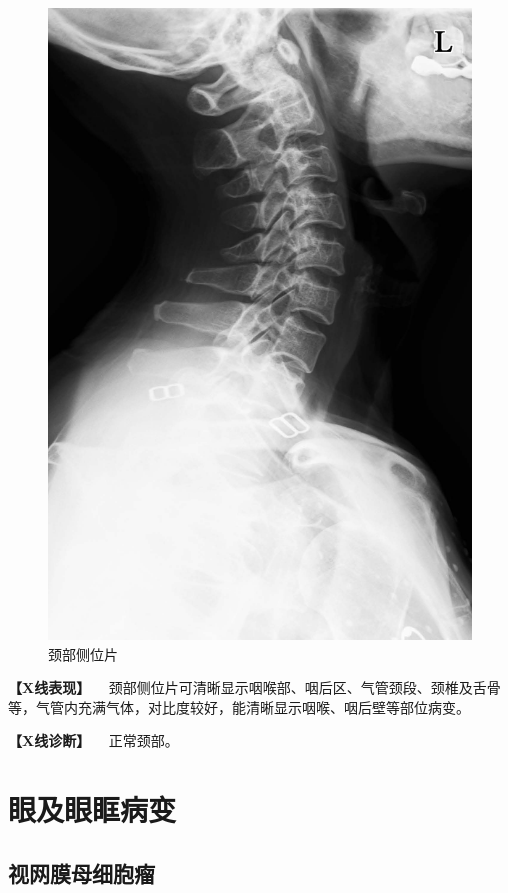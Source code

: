 \begin{figure}[!htbp]
 \centering
 \includegraphics{./images/Image00416.jpg}
 \captionsetup{justification=centering}
 \caption{颈部侧位片}
 \label{fig7-1-6}
  \end{figure} 

\textbf{【X线表现】}
　颈部侧位片可清晰显示咽喉部、咽后区、气管颈段、颈椎及舌骨等，气管内充满气体，对比度较好，能清晰显示咽喉、咽后壁等部位病变。

\textbf{【X线诊断】} 　正常颈部。

\section{眼及眼眶病变}

\subsection{视网膜母细胞瘤}

